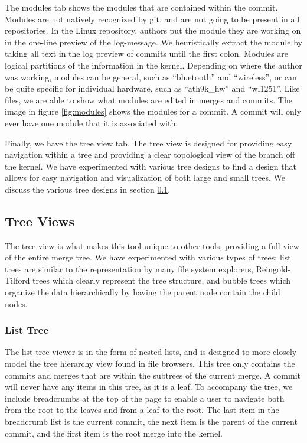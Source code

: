 \documentclass[conference, draftclsnofoot]{IEEEtran}
\begin{document}
The modules tab shows the modules that are contained within the commit. Modules are
not natively recognized by git, and are not going to be present in all repositories.
In the Linux repository, authors put the module they are working on in the one-line
preview of the log-message. We heuristically extract the module by taking all text
in the log preview of commits until the first colon.  Modules are logical partitions
of the information in the kernel. Depending on where the author was working, modules
can be general, such as ``bluetooth'' and ``wireless'', or can be quite specific for
individual hardware, such as ``ath9k\_hw'' and ``wl1251''. Like files, we are able
to show what modules are edited in merges and commits. The image in figure
\ref{fig:modules} shows the modules for a commit. A commit will only ever have one
module that it is associated with.

Finally, we have the tree view tab. The tree view is designed for providing easy
navigation within a tree and providing a clear topological view of the branch off
the kernel. We have experimented with various tree designs to find a design that
allows for easy navigation and visualization of both large and small trees. We
discuss the various tree designs in section \ref{treeview_section}.

\subsection{Tree Views} \label{treeview_section}

The tree view is what makes this tool unique to other tools, providing a full view
of the entire merge tree. We have experimented with various types of trees; list
trees are similar to the representation by many file system explorers,
Reingold-Tilford trees which clearly represent the tree structure, and bubble trees
which organize the data hierarchically by having the parent node contain the child
nodes.

\subsubsection{List Tree}

The list tree  viewer is in the form of nested lists, and is designed to more
closely model the tree hierarchy view found in file browsers. This tree only
contains the commits and merges that are within the subtrees of the current merge. A
commit will never have any items in this tree, as it is a leaf. To accompany the
tree, we include breadcrumbs at the top of the page to enable a user to navigate
both from the root to the leaves and from a leaf to the root. The last item in the
breadcrumb list is the current commit, the next item is the parent of the current
commit, and the first item is the root merge into the kernel.
\end{document}
